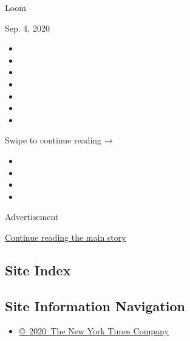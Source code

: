 Loom

Sep. 4, 2020

\begin{itemize}
\item
\item
\item
\item
\item
\item
\item
\end{itemize}

Swipe to continue reading →

\begin{itemize}
\item
\item
\item
\item
\end{itemize}

Advertisement

\protect\hyperlink{after-bottom}{Continue reading the main story}

\hypertarget{site-index}{%
\subsection{Site Index}\label{site-index}}

\hypertarget{site-information-navigation}{%
\subsection{Site Information
Navigation}\label{site-information-navigation}}

\begin{itemize}
\tightlist
\item
  \href{https://help.nytimes3xbfgragh.onion/hc/en-us/articles/115014792127-Copyright-notice}{©~2020~The
  New York Times Company}
\end{itemize}


